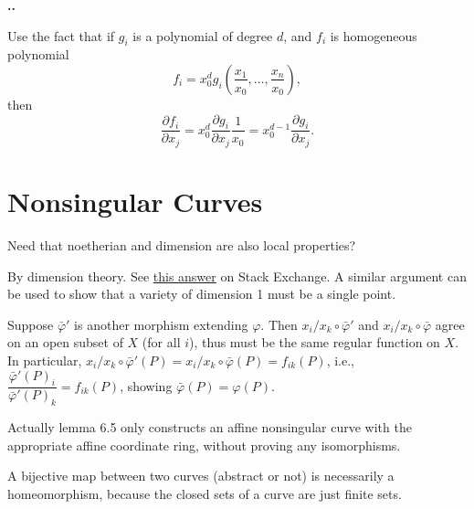 \documentclass{note}
\makeatletter
\newcounter{exercise}[section]
\newcommand\Ex{
    \if@noskipsec \leavevmode \fi
    \par
    \refstepcounter{exercise}
    \textbf{\thesection.\arabic{exercise}.}
}
\makeatother
\begin{document}
\setcounter{exercise}{7}

\Ex

Use the fact that if $g_i$ is a polynomial of degree $d$, and $f_i$ is
homogeneous polynomial
\begin{equation*}
  f_i = x_0^d g_i\left(\frac{x_1}{x_0}, \dots, \frac{x_n}{x_0}\right),
\end{equation*}
then
\begin{equation*}
  \frac{\partial f_i}{\partial x_j} = x_0^d\frac{\partial g_i}{\partial
    x_j}\frac{1}{x_0} = x_0^{d-1}\frac{\partial g_i}{\partial x_j}.
\end{equation*}

\section{Nonsingular Curves}

 Need that noetherian and dimension are also local
properties?


By dimension theory. See
\href{https://math.stackexchange.com/questions/140592/closed-proper-subvarieties-of-curves-are-finite-sets-of-points}
{this answer} on Stack Exchange. A similar argument can be used to show that a
variety of dimension 1 must be a single point.



Suppose $\bar\varphi'$ is another morphism extending $\varphi$. Then
$x_i/x_k\circ\bar\varphi'$ and $x_i/x_k\circ\bar\varphi$ agree on an open
subset of $X$ (for all $i$), thus must be the same regular function on $X$. In
particular, $x_i/x_k\circ\bar\varphi'(P) = x_i/x_k\circ\bar\varphi(P) =
  f_{ik}(P)$, i.e., $\dfrac{\bar\varphi'(P)_i}{\bar\varphi'(P)_k} = f_{ik}(P)$,
showing $\bar\varphi(P) = \varphi(P)$.

 Actually lemma 6.5 only constructs an affine nonsingular curve
with the appropriate affine coordinate ring, without proving any isomorphisms.



A bijective map between two curves (abstract or not) is necessarily a
homeomorphism, because the closed sets of a curve are just finite sets.
\end{document}
